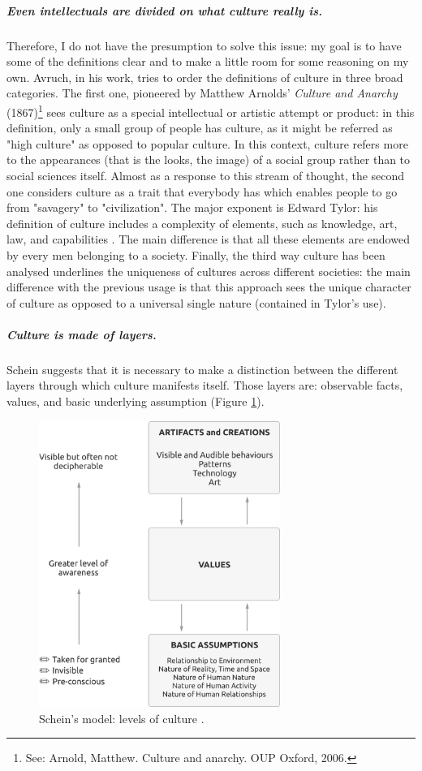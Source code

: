 \documentclass[../main.tex]{subfiles}
\begin{document}
\subparagraph{Even intellectuals are divided on what culture really is.} Therefore, I do not have the presumption to solve this issue: my goal is to have some of the definitions clear and to make a little room for some reasoning on my own. Avruch, in his work, tries to order the definitions of culture in three broad categories. The first one, pioneered by Matthew Arnolds' \textit{Culture and Anarchy} (1867)\footnote{See: Arnold, Matthew. Culture and anarchy. OUP Oxford, 2006.} sees culture as a special intellectual or artistic attempt or product: in this definition, only a small group of people has culture, as it might be referred as "high culture" as opposed to popular culture. In this context, culture refers more to the appearances (that is the looks, the image) of a social group rather than to social sciences itself. Almost as a response to this stream of thought, the second one considers culture as a trait that everybody has which enables people to go from "savagery" to "civilization". The major exponent is Edward Tylor: his definition of culture includes a complexity of elements, such as knowledge, art, law, and capabilities \mancite\autocite[1]{tylor}. The main difference is that all these elements are endowed by every men belonging to a society. Finally, the third way culture has been analysed underlines the uniqueness of cultures across different societies: the main difference with the previous usage is that this approach sees the unique character of culture as opposed to a universal single nature (contained in Tylor's use).

\subparagraph*{Culture is made of layers.} Schein %
suggests that it is necessary to make a distinction between the different layers through which culture manifests itself. Those layers are: observable facts, values, and basic underlying assumption (Figure \ref{fig:schein}).
\begin{figure}[h]
    \centering\includegraphics[width=0.7\textwidth]{images/values}
    \caption{Schein's model: levels of culture \autocite[4]{schein}.} %
    \label{fig:schein}
\end{figure}
\end{document}
